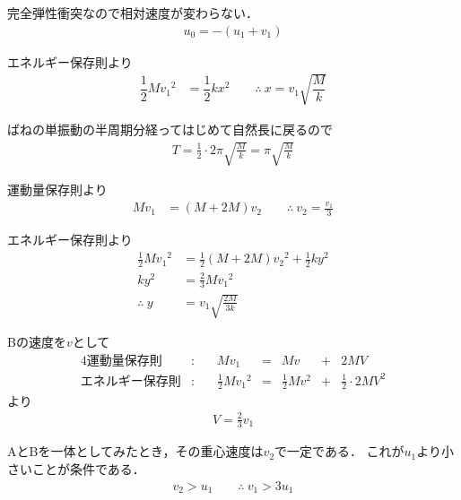\begin{comment}

\end{comment}

完全弾性衝突なので相対速度が変わらない．
\begin{align*}
  u_0 = -(u_1+v_1)
\end{align*}

エネルギー保存則より
\begin{align*}
  \dfrac{1}{2}M{v_1}^2 &= \dfrac{1}{2}kx^2 \qquad
  \therefore\ x = v_1\sqrt{\dfrac{M}{k}}
\end{align*}

ばねの単振動の半周期分経ってはじめて自然長に戻るので
\begin{align*}
  T = \frac{1}{2}\cdotp 2\pi\sqrt{\frac{M}{k}} = \pi\sqrt{\frac{M}{k}}
\end{align*}

運動量保存則より
\begin{align*}
  Mv_1 &= (M+2M)v_2 \qquad
  \therefore\ v_2 = \frac{v_1}{3}
\end{align*}

エネルギー保存則より
\begin{align*}
  \frac{1}{2}M{v_1}^2 &= \frac{1}{2}(M+2M){v_2}^2 + \frac{1}{2}ky^2 \\
  ky^2 &= \frac{2}{3}M{v_1}^2 \\
  \therefore\ y &= v_1\sqrt{\frac{2M}{3k}}
\end{align*}

Bの速度を$v$として
\begin{alignat*}{4}
  \text{運動量保存則}&:& Mv_1 &=& Mv &+& 2MV \\
  \text{エネルギー保存則}&:\quad& \frac{1}{2}M{v_1}^2 &=& \frac{1}{2}M{v}^2 &+& \frac{1}{2}\cdotp 2M{V}^2
\end{alignat*}
より
\begin{align*}
  V = \frac{2}{3}v_1
\end{align*}

AとBを一体としてみたとき，その重心速度は$v_2$で一定である．
これが$u_1$より小さいことが条件である．
\begin{align*}
  v_2 > u_1 \qquad
  \therefore\ v_1 > 3u_1
\end{align*}


